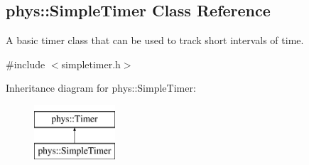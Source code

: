 \hypertarget{classphys_1_1SimpleTimer}{
\subsection{phys::SimpleTimer Class Reference}
\label{classphys_1_1SimpleTimer}
}


A basic timer class that can be used to track short intervals of time.  




{\ttfamily \#include $<$simpletimer.h$>$}

Inheritance diagram for phys::SimpleTimer:\begin{figure}[H]
\begin{center}
\leavevmode
\includegraphics[height=2.000000cm]{classphys_1_1SimpleTimer}
\end{center}
\end{figure}
